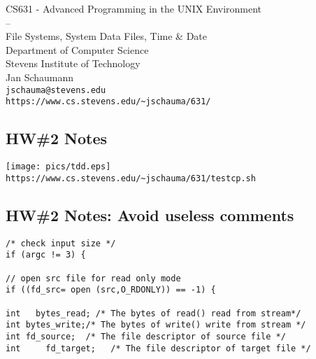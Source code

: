 \documentclass[xga]{xdvislides}
\begin{document}
\setfontphv

\lhead{\slidetitle}
\cfoot{\relax}
\rfoot{\Gray{\today}}

\vspace*{\fill}
\begin{center}
	\Hugesize
		CS631 - Advanced Programming in the UNIX Environment\\
		-- \\
		File Systems, System Data Files, Time \& Date
	\hspace*{5mm}\blueline\\ [1em]
	\Normalsize
		Department of Computer Science\\
		Stevens Institute of Technology\\
		Jan Schaumann\\
		\verb+jschauma@stevens.edu+\\
		\verb+https://www.cs.stevens.edu/~jschauma/631/+
\end{center}
\vspace*{\fill}

\subsection{HW\#2 Notes}
\vspace*{\fill}
\begin{center}
\texttt{[image: pics/tdd.eps]} \\
{\tt https://www.cs.stevens.edu/\~{}jschauma/631/testcp.sh}
\end{center}
\vspace*{\fill}

\subsection{HW\#2 Notes: Avoid useless comments}
\Huge
\begin{verbatim}
/* check input size */
if (argc != 3) {

// open src file for read only mode
if ((fd_src= open (src,O_RDONLY)) == -1) {

int   bytes_read; /* The bytes of read() read from stream*/
int bytes_write;/* The bytes of write() write from stream */
int fd_source;  /* The file descriptor of source file */
int     fd_target;   /* The file descriptor of target file */

\end{verbatim}
\Normalsize
\end{document}
